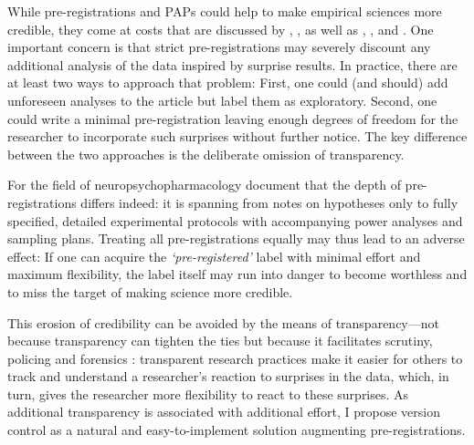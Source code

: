 \documentclass[
  authoryear,
  review,
  3p,
  onecolumn]{elsarticle}
\begin{document}
While pre-registrations and PAPs could help to make empirical sciences
more credible, they come at costs that are discussed by
\citet{Olken2015}, \citet{PageEtAl2021}, as well as \citet{Krishna2021},
\citet{SimmonsEtAl2021}, and \citet{PhamEtAl2021}. One important concern
is that strict pre-registrations may severely discount any additional
analysis of the data inspired by surprise results. In practice, there
are at least two ways to approach that problem: First, one could (and
should) add unforeseen analyses to the article but label them as
exploratory. Second, one could write a minimal pre-registration leaving
enough degrees of freedom for the researcher to incorporate such
surprises without further notice. The key difference between the two
approaches is the deliberate omission of transparency.

For the field of neuropsychopharmacology \citet{WaldronAllen2022}
document that the depth of pre-registrations differs indeed: it is
spanning from notes on hypotheses only to fully specified, detailed
experimental protocols with accompanying power analyses and sampling
plans. Treating all pre-registrations equally may thus lead to an
adverse effect: If one can acquire the \emph{`pre-registered'} label
with minimal effort and maximum flexibility, the label itself may run
into danger to become worthless and to miss the target of making science
more credible.

This erosion of credibility can be avoided by the means of
transparency---not because transparency can tighten the ties but because
it facilitates scrutiny, policing
\citep[see][]{AnkelPetersFialaNeubauer2023} and forensics \citep[see,
e.g.,][]{SimonsohnEtAl2023}: transparent research practices make it
easier for others to track and understand a researcher's reaction to
surprises in the data, which, in turn, gives the researcher more
flexibility to react to these surprises. As additional transparency is
associated with additional effort, I propose version control as a
natural and easy-to-implement solution augmenting pre-registrations.
\end{document}
